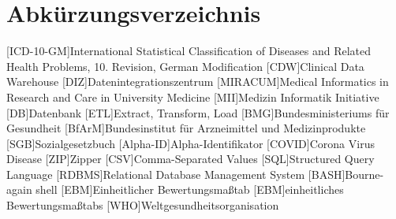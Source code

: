 \section*{Abkürzungsverzeichnis}
\begin{acronym}[acrmeta]		
	[ICD-10-GM]{International Statistical Classification of Diseases and Related Health Problems, 10. Revision, German Modification}
	[CDW]{Clinical Data Warehouse}
	[DIZ]{Datenintegrationszentrum}
	[MIRACUM]{Medical Informatics in Research and Care in University Medicine}
	[MII]{Medizin Informatik Initiative}
	[DB]{Datenbank}
	[ETL]{Extract, Transform, Load}
	[BMG]{Bundesministeriums für Gesundheit}
	[BfArM]{Bundesinstitut für Arzneimittel und Medizinprodukte}
	[SGB]{Sozialgesetzbuch}
	[Alpha-ID]{Alpha-Identifikator}
	[COVID]{Corona Virus Disease}
	[ZIP]{Zipper}
	[CSV]{Comma-Separated Values}
	[SQL]{Structured Query Language}
	[RDBMS]{Relational Database Management System}
	[BASH]{Bourne-again shell}
	[EBM]{Einheitlicher Bewertungsmaßtab}
	[EBM]{einheitliches Bewertungsmaßtabs}
	[WHO]{Weltgesundheitsorganisation}
	
\end{acronym}
